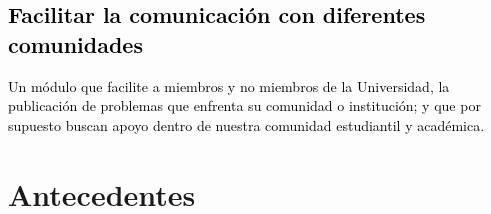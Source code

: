 \documentclass[11pt,letterpaper,titlepage]{article}
\begin{document}

\textcolor{black}{
\subsection{Facilitar la comunicaci\'on con diferentes comunidades}
Un m\'odulo que facilite a miembros y no miembros de la Universidad, la publicaci\'on de problemas que enfrenta su comunidad o instituci\'on; y que por supuesto buscan apoyo dentro de nuestra comunidad estudiantil y acad\'emica. }


\section{Antecedentes}
\end{document}
